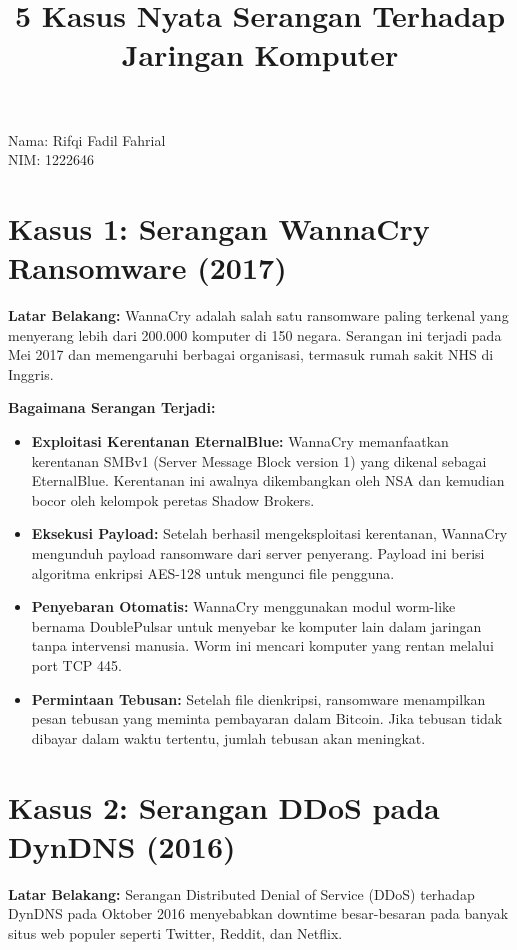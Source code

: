 \documentclass[12pt]{article}
\title{5 Kasus Nyata Serangan Terhadap Jaringan Komputer}
\author{}
\date{}
\begin{document}
\maketitle
\begin{center}
  Nama: Rifqi Fadil Fahrial \\
  NIM: 1222646 \\
\end{center}
\section*{Kasus 1: Serangan WannaCry Ransomware (2017)}
\textbf{Latar Belakang:} 
WannaCry adalah salah satu ransomware paling terkenal yang menyerang lebih dari 200.000 komputer di 150 negara. Serangan ini terjadi pada Mei 2017 dan memengaruhi berbagai organisasi, termasuk rumah sakit NHS di Inggris.

\textbf{Bagaimana Serangan Terjadi:}
\begin{itemize}
    \item \textbf{Exploitasi Kerentanan EternalBlue:} WannaCry memanfaatkan kerentanan SMBv1 (Server Message Block version 1) yang dikenal sebagai EternalBlue. Kerentanan ini awalnya dikembangkan oleh NSA dan kemudian bocor oleh kelompok peretas Shadow Brokers.
    \item \textbf{Eksekusi Payload:} Setelah berhasil mengeksploitasi kerentanan, WannaCry mengunduh payload ransomware dari server penyerang. Payload ini berisi algoritma enkripsi AES-128 untuk mengunci file pengguna.
    \item \textbf{Penyebaran Otomatis:} WannaCry menggunakan modul worm-like bernama DoublePulsar untuk menyebar ke komputer lain dalam jaringan tanpa intervensi manusia. Worm ini mencari komputer yang rentan melalui port TCP 445.
    \item \textbf{Permintaan Tebusan:} Setelah file dienkripsi, ransomware menampilkan pesan tebusan yang meminta pembayaran dalam Bitcoin. Jika tebusan tidak dibayar dalam waktu tertentu, jumlah tebusan akan meningkat.
\end{itemize}

\section*{Kasus 2: Serangan DDoS pada DynDNS (2016)}
\textbf{Latar Belakang:} 
Serangan Distributed Denial of Service (DDoS) terhadap DynDNS pada Oktober 2016 menyebabkan downtime besar-besaran pada banyak situs web populer seperti Twitter, Reddit, dan Netflix.
\end{document}
